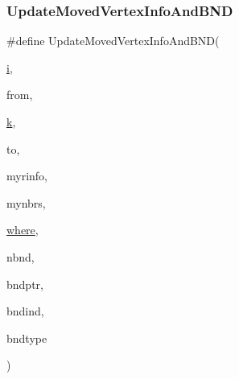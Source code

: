 \subsubsection{\texorpdfstring{Update\+Moved\+Vertex\+Info\+And\+B\+ND}{UpdateMovedVertexInfoAndBND}}
{\footnotesize\ttfamily \#define Update\+Moved\+Vertex\+Info\+And\+B\+ND(\begin{DoxyParamCaption}\item[{}]{\hyperlink{a00608_afb6aca53df96564f2adf086c942453ec}{i},  }\item[{}]{from,  }\item[{}]{\hyperlink{a00605_a6086917dfee54d84abe1838505c8cf69}{k},  }\item[{}]{to,  }\item[{}]{myrinfo,  }\item[{}]{mynbrs,  }\item[{}]{\hyperlink{a00879_a7a355801f721e9d8d4ae03590a3a56b0}{where},  }\item[{}]{nbnd,  }\item[{}]{bndptr,  }\item[{}]{bndind,  }\item[{}]{bndtype }\end{DoxyParamCaption})}

